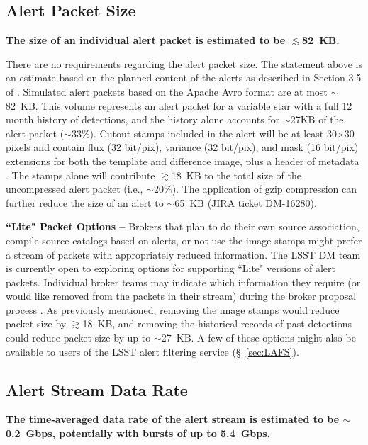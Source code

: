\documentclass[DM,authoryear,toc]{lsstdoc}
\begin{document}
\subsection{Alert Packet Size}\label{ssec:packet_size}

{\bf The size of an individual alert packet is estimated to be $\lesssim$82~KB.}

There are no requirements regarding the alert packet size. The statement above is an estimate based on the planned content of the alerts as described in Section 3.5 of . Simulated alert packets based on the Apache Avro format are at most $\sim$82~KB. This volume represents an alert packet for a variable star with a full 12 month history of detections, and the history alone accounts for $\sim$27KB of the alert packet ($\sim$33\%). Cutout stamps included in the alert will be at least 30$\times$30 pixels and contain \gls{flux} (32 bit/pix), variance (32 bit/pix), and mask (16 bit/pix) extensions for both the template and difference image, plus a header of \gls{metadata} . The stamps alone will contribute $\gtrsim$18~KB to the total size of the uncompressed alert packet (i.e., $\sim$20\%). The application of gzip compression can further reduce the size of an alert to $\sim$65~KB (\gls{JIRA} ticket \gls{DM}-16280). 

{\bf ``Lite" Packet Options --} Brokers that plan to do their own source association, compile source catalogs based on alerts, or not use the image stamps might prefer a stream of packets with appropriately reduced information. 
The \gls{LSST} \gls{DM} team is currently open to exploring options for supporting ``Lite" versions of alert packets. Individual broker teams may indicate which information they require (or would like removed from the packets in their stream) during the broker proposal process .
As previously mentioned, removing the image stamps would reduce packet size by $\gtrsim$18~KB, and removing the historical records of past detections could reduce packet size by up to $\sim$27~KB. 
A few of these options might also be available to users of the \gls{LSST} alert filtering service (\S~\ref{sec:LAFS}).

\subsection{Alert Stream Data Rate}\label{ssec:data_rate}

{\bf The time-averaged data rate of the alert stream is estimated to be $\sim$0.2~Gbps, potentially with bursts of up to 5.4~Gbps.}
\end{document}
